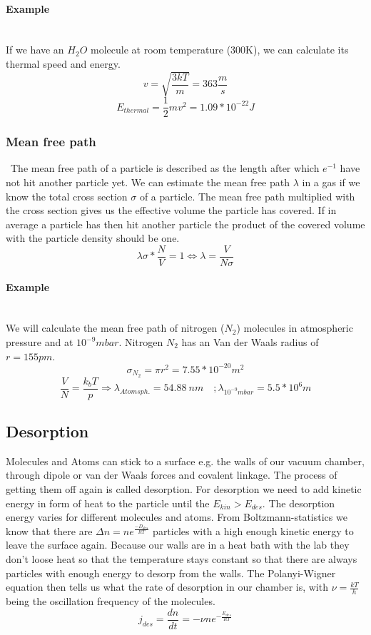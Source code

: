 \documentclass[]{article}
\begin{document}
 \paragraph{Example}
 \mbox{}\\
 If we have an $H_{2}O$ molecule at room temperature (300K), we can calculate its thermal speed and energy.\[ 
 v=\sqrt{\frac{3kT}{m}}=363\frac{m}{s} \]
 \[ E_{thermal}=\frac{1}{2}mv^{2}=1.09*10^{-22}J \]

\subsubsection{Mean free path}\
The mean free path of a particle is described as the length after which $e^{-1}$ have not hit another particle yet. We can estimate the mean free path $\lambda$ in a gas if we know the total cross section $\sigma$  of a particle. The mean free path multiplied with the cross section gives us the effective volume the particle has covered. If in average a particle has then hit another particle the product of the covered volume with the particle density should be one.\[\lambda \sigma *\frac{N}{V}=1 \Leftrightarrow \lambda=\frac{V}{N\sigma}  \]

\paragraph{Example}\mbox{}\\
We will calculate the mean free path of nitrogen ($N_{2}$) molecules in atmospheric pressure and at $10^{-9}mbar$. Nitrogen $N_{2}$ has an Van der Waals radius of $r = 155 pm$. \[\sigma_{N_{2}}=\pi r^{2}=7.55*10^{-20}m^{2} \]\[ \frac{V}{N}=\frac{k_{b}T}{p} \Rightarrow \lambda_{Atomsph.}=54.88\:nm   \quad ;\lambda_{10^{-9}mbar}=5.5*10^{6}m \]


\subsection{Desorption}
Molecules and Atoms can stick to a surface e.g. the walls of our vacuum chamber, through dipole or van der Waals forces and covalent linkage. The process of getting them off again is called desorption. For desorption we need to add kinetic energy in form of heat to the particle until the $E_{kin}>E_{des}$. The desorption energy varies for different molecules and atoms. From Boltzmann-statistics we know that there are $\Delta n=ne^{\frac{-D_{des}}{RT}}$ particles with a high enough kinetic energy to leave the surface again. Because our walls are in a heat bath with the lab they don't loose heat so that the temperature stays constant so that there are always particles with enough energy to desorp from the walls. The Polanyi-Wigner equation then tells us what the rate of desorption in our chamber is, with $\nu=\frac{kT}{h}$ being the oscillation frequency of the molecules.\[ j_{des}=\frac{dn}{dt}=-\nu n e^{-\frac{E_{des}}{RT}} \] 
\end{document}

